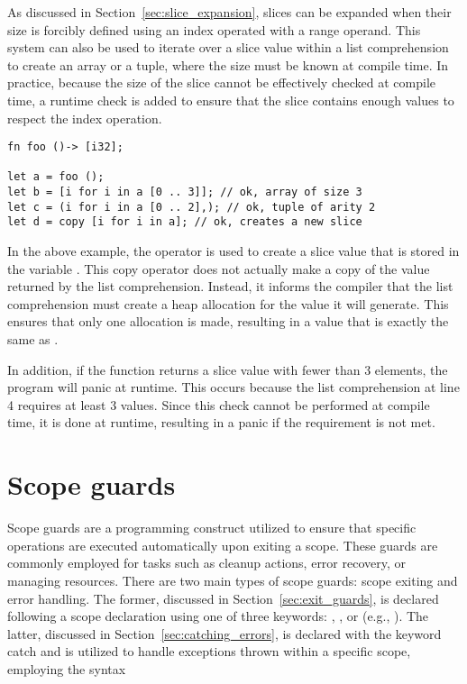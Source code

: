 As discussed in Section~\ref{sec:slice_expansion}, slices can be expanded when
their size is forcibly defined using an index operated with a range operand.
This system can also be used to iterate over a slice value within a list
comprehension to create an array or a tuple, where the size must be known at
compile time. In practice, because the size of the slice cannot be effectively
checked at compile time, a runtime check is added to ensure that the slice
contains enough values to respect the index operation.

\begin{lstlisting}[style=coloredverbatim, label=lst:list_compr_slice_to_array, caption=List comprehension over a slice with cte size]
fn foo ()-> [i32];

let a = foo ();
let b = [i for i in a [0 .. 3]]; // ok, array of size 3
let c = (i for i in a [0 .. 2],); // ok, tuple of arity 2
let d = copy [i for i in a]; // ok, creates a new slice
\end{lstlisting}

In the above example, the  operator is used to create a slice value
that is stored in the variable . This copy operator does not actually
make a copy of the value returned by the list comprehension. Instead, it informs
the compiler that the list comprehension must create a heap allocation for the
value it will generate. This ensures that only one allocation is made, resulting
in a value that is exactly the same as .

In addition, if the function  returns a slice value with fewer than 3
elements, the program will panic at runtime. This occurs because the list
comprehension at line 4 requires at least 3 values. Since this check cannot be
performed at compile time, it is done at runtime, resulting in a panic if the
requirement is not met.

\vfill%
\pagebreak

\section{Scope guards}%
\label{sec:scope_guards}

Scope guards are a programming construct utilized to ensure that specific
operations are executed automatically upon exiting a scope. These guards are
commonly employed for tasks such as cleanup actions, error recovery, or managing
resources. There are two main types of scope guards: scope exiting and error
handling. The former, discussed in Section~\ref{sec:exit_guards}, is declared
following a scope declaration using one of three keywords: ,
, or  (e.g., ). The
latter, discussed in Section~\ref{sec:catching_errors}, is declared with the
keyword catch and is utilized to handle exceptions thrown within a specific
scope, employing the syntax 


